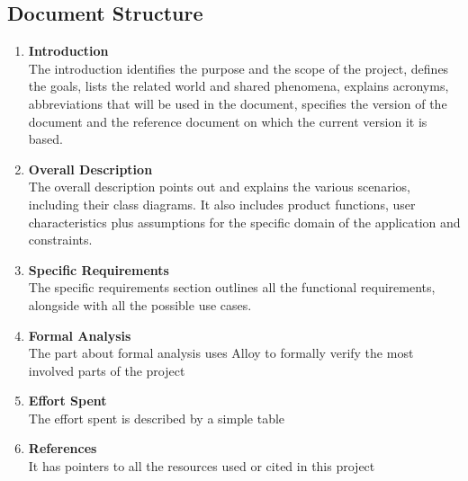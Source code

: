 \subsection{Document Structure}
    \begin{enumerate}
        \item\textbf{Introduction}\\
            The introduction identifies the purpose and the scope of the project, defines the goals, lists the related world and shared phenomena, explains acronyms, abbreviations that will be used in the document, specifies the version of the document and the reference document on which the current version it is based.
        \item\textbf{Overall Description}\\
            The overall description points out and explains the various scenarios, including their class diagrams. It also includes product functions, user characteristics plus assumptions for the specific domain of the application and constraints.
        \item\textbf{Specific Requirements}\\
            The specific requirements section outlines all the functional requirements, alongside with all the possible use cases.
        \item\textbf{Formal Analysis} \\
            The part about formal analysis uses Alloy to formally verify the most involved parts of the project
        \item\textbf{Effort Spent}\\
            The effort spent is described by a simple table
        \item\textbf{References}\\
            It has pointers to all the resources used or cited in this project
    \end{enumerate}
    